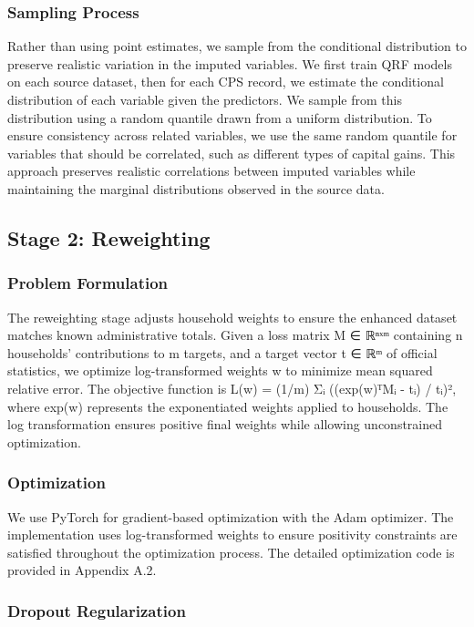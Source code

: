 \subsubsection{Sampling Process}

Rather than using point estimates, we sample from the conditional distribution to preserve realistic variation in the imputed variables. We first train QRF models on each source dataset, then for each CPS record, we estimate the conditional distribution of each variable given the predictors. We sample from this distribution using a random quantile drawn from a uniform distribution. To ensure consistency across related variables, we use the same random quantile for variables that should be correlated, such as different types of capital gains. This approach preserves realistic correlations between imputed variables while maintaining the marginal distributions observed in the source data.

\subsection{Stage 2: Reweighting}

\subsubsection{Problem Formulation}

The reweighting stage adjusts household weights to ensure the enhanced dataset matches known administrative totals. Given a loss matrix M ∈ ℝⁿˣᵐ containing n households' contributions to m targets, and a target vector t ∈ ℝᵐ of official statistics, we optimize log-transformed weights w to minimize mean squared relative error. The objective function is L(w) = (1/m) Σᵢ ((exp(w)ᵀMᵢ - tᵢ) / tᵢ)², where exp(w) represents the exponentiated weights applied to households. The log transformation ensures positive final weights while allowing unconstrained optimization.

\subsubsection{Optimization}

We use PyTorch for gradient-based optimization with the Adam optimizer. The implementation uses log-transformed weights to ensure positivity constraints are satisfied throughout the optimization process. The detailed optimization code is provided in Appendix A.2.

\subsubsection{Dropout Regularization}


